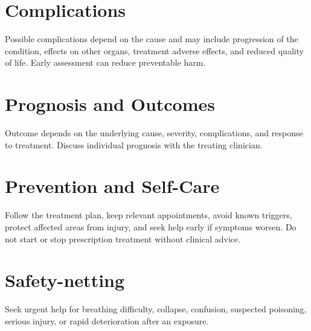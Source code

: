 \section*{Complications}
Possible complications depend on the cause and may include progression of the condition, effects on other organs, treatment adverse effects, and reduced quality of life. Early assessment can reduce preventable harm.

\section*{Prognosis and Outcomes}
Outcome depends on the underlying cause, severity, complications, and response to treatment. Discuss individual prognosis with the treating clinician.

\section*{Prevention and Self-Care}
Follow the treatment plan, keep relevant appointments, avoid known triggers, protect affected areas from injury, and seek help early if symptoms worsen. Do not start or stop prescription treatment without clinical advice.
\section*{Safety-netting}
Seek urgent help for breathing difficulty, collapse, confusion, suspected poisoning, serious injury, or rapid deterioration after an exposure.
